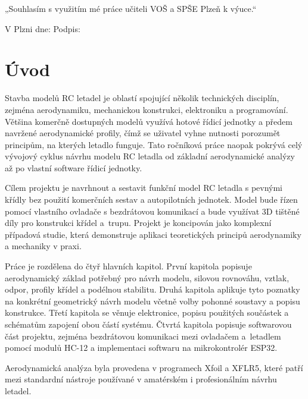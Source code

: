 \documentclass[12pt, a4paper, oneside]{report}
\begin{document}
\noindent „Souhlasím s využitím mé práce učiteli VOŠ a SPŠE Plzeň k výuce.“

\vspace{2cm}
\noindent V Plzni dne: \makebox[5cm]{\dotfill} \hfill Podpis: \makebox[5cm]{\dotfill}


\tableofcontents
\newpage
{}
\setcounter{page}{10}
\newpage

\chapter*{Úvod}

Stavba modelů RC letadel je oblastí spojující několik technických disciplín, 
zejména aerodynamiku, mechanickou konstrukci, elektroniku a programování. 
Většina komerčně dostupných modelů využívá hotové řídicí jednotky a předem 
navržené aerodynamické profily, čímž se uživatel vyhne nutnosti porozumět 
principům, na kterých letadlo funguje. Tato ročníková práce naopak pokrývá 
celý vývojový cyklus návrhu modelu RC letadla od základní aerodynamické 
analýzy až po vlastní software řídicí jednotky.

Cílem projektu je navrhnout a sestavit funkční model RC letadla s pevnými 
křídly bez použití komerčních sestav a autopilotních jednotek. Model bude
řízen pomocí vlastního ovladače s bezdrátovou komunikací a bude využívat 3D 
tištěné díly pro konstrukci křídel a~trupu. Projekt je koncipován jako komplexní 
případová studie, která demonstruje aplikaci teoretických principů aerodynamiky a 
mechaniky v praxi.


Práce je rozdělena do čtyř hlavních kapitol. První kapitola popisuje 
aerodynamický základ potřebný pro návrh modelu, silovou rovnováhu, vztlak, 
odpor, profily křídel a podélnou stabilitu. Druhá kapitola aplikuje tyto 
poznatky na konkrétní geometrický návrh modelu včetně volby pohonné soustavy 
a popisu konstrukce. Třetí kapitola se věnuje elektronice, popisu použitých součástek
 a schématům zapojení obou částí systému. Čtvrtá kapitola popisuje 
softwarovou část projektu, zejména bezdrátovou komunikaci mezi ovladačem a~letadlem 
pomocí modulů HC-12 a implementaci softwaru na mikrokontrolér ESP32.

Aerodynamická analýza byla provedena v programech Xfoil a XFLR5, které 
patří mezi standardní nástroje používané v amatérském i profesionálním 
návrhu letadel.
\end{document}
